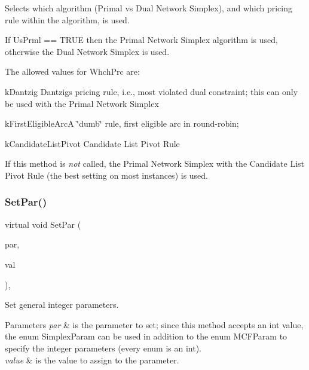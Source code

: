 Selects which algorithm (Primal vs Dual Network Simplex), and which pricing rule within the algorithm, is used.

If Us\+Prml == T\+R\+UE then the Primal Network Simplex algorithm is used, otherwise the Dual Network Simplex is used.

The allowed values for Whch\+Prc are\+:


\begin{DoxyItemize}
\item k\+Dantzig Dantzig\textquotesingle{}s pricing rule, i.\+e., most violated dual constraint; this can only be used with the Primal Network Simplex
\item k\+First\+Eligible\+ArcA \char`\"{}dumb\char`\"{} rule, first eligible arc in round-\/robin;
\item k\+Candidate\+List\+Pivot Candidate List Pivot Rule
\end{DoxyItemize}

If this method is {\itshape not} called, the Primal Network Simplex with the Candidate List Pivot Rule (the best setting on most instances) is used. \mbox{\label{class_m_c_f_simplex_aebda2a23b313bb3ab143e66137ada924}} 
\subsubsection{\texorpdfstring{Set\+Par()}{SetPar()}\hspace{0.1cm}{\footnotesize\ttfamily [1/2]}}
{\footnotesize\ttfamily virtual void Set\+Par (\begin{DoxyParamCaption}\item[{int}]{par,  }\item[{int}]{val }\end{DoxyParamCaption})\hspace{0.3cm}{\ttfamily [override]}, {\ttfamily [virtual]}}

Set general integer parameters.


\begin{DoxyParams}{Parameters}
{\em par} & is the parameter to set; since this method accepts an int value, the enum Simplex\+Param can be used in addition to the enum M\+C\+F\+Param to specify the integer parameters (every enum is an int).\\
\hline
{\em value} & is the value to assign to the parameter. \\
\hline
\end{DoxyParams}


